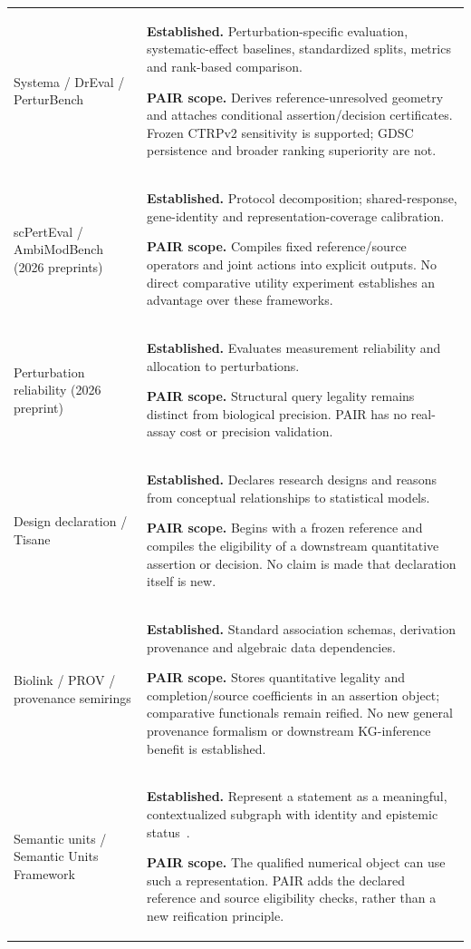 \documentclass[11pt]{article}
\begin{document}
\begin{longtable}{@{}>{\raggedright\arraybackslash}p{}>{\raggedright\arraybackslash}p{}@{}}
Systema / DrEval / PerturBench & \textbf{Established.} Perturbation-specific evaluation, systematic-effect baselines, standardized splits, metrics and rank-based comparison. \par\smallskip\textbf{PAIR scope.} Derives reference-unresolved geometry and attaches conditional assertion/decision certificates. Frozen CTRPv2 sensitivity is supported; GDSC persistence and broader ranking superiority are not.  \\
scPertEval / AmbiModBench (2026 preprints)~\cite{schafer2026scperteval,huang2026ambimod} & \textbf{Established.} Protocol decomposition; shared-response, gene-identity and representation-coverage calibration. \par\smallskip\textbf{PAIR scope.} Compiles fixed reference/source operators and joint actions into explicit outputs. No direct comparative utility experiment establishes an advantage over these frameworks.  \\
Perturbation reliability (2026 preprint)~\cite{wang2026reliable} & \textbf{Established.} Evaluates measurement reliability and allocation to perturbations. \par\smallskip\textbf{PAIR scope.} Structural query legality remains distinct from biological precision. PAIR has no real-assay cost or precision validation.  \\
Design declaration / Tisane~\cite{blair2019declaring,jun2022tisane} & \textbf{Established.} Declares research designs and reasons from conceptual relationships to statistical models. \par\smallskip\textbf{PAIR scope.} Begins with a frozen reference and compiles the eligibility of a downstream quantitative assertion or decision. No claim is made that declaration itself is new.  \\
Biolink / PROV / provenance semirings & \textbf{Established.} Standard association schemas, derivation provenance and algebraic data dependencies. \par\smallskip\textbf{PAIR scope.} Stores quantitative legality and completion/source coefficients in an assertion object; comparative functionals remain reified. No new general provenance formalism or downstream KG-inference benefit is established.  \\
Semantic units / Semantic Units Framework & \textbf{Established.} Represent a statement as a meaningful, contextualized subgraph with identity and epistemic status~\cite{vogt2024semanticunits,vogt2026framework}. \par\smallskip\textbf{PAIR scope.} The qualified numerical object can use such a representation. PAIR adds the declared reference and source eligibility checks, rather than a new reification principle.  \\

\end{longtable}
\end{document}
